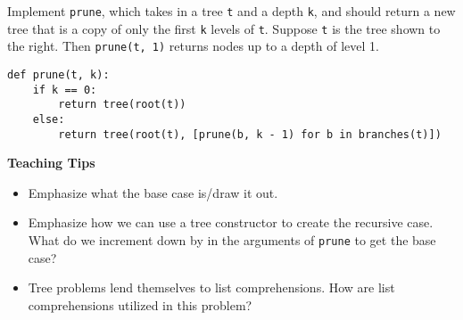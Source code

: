 \begin{blocksection}
\question Implement \lstinline$prune$, which takes in a tree \lstinline$t$ and a depth
\lstinline$k$, and should return a new tree that is a copy of only the first \lstinline$k$
levels of \lstinline$t$. Suppose \lstinline$t$ is the tree shown to the right. Then
\lstinline$prune(t, 1)$ returns nodes up to a depth of level 1.

\begin{solution}[1in]
\begin{lstlisting}
def prune(t, k):
    if k == 0:
        return tree(root(t))
    else:
        return tree(root(t), [prune(b, k - 1) for b in branches(t)])
\end{lstlisting}
\end{solution}
\end{blocksection}

\begin{guide}
    \begin{blocksection}
    \textbf{Teaching Tips}
    \begin{itemize}
        \item Emphasize what the base case is/draw it out.
        \item Emphasize how we can use a tree constructor to create the recursive case. What do we increment down by in the arguments of \lstinline$prune$ to get the base case?
        \item Tree problems lend themselves to list comprehensions. How are list comprehensions utilized in this problem?
    \end{itemize}
    \end{blocksection}
\end{guide}